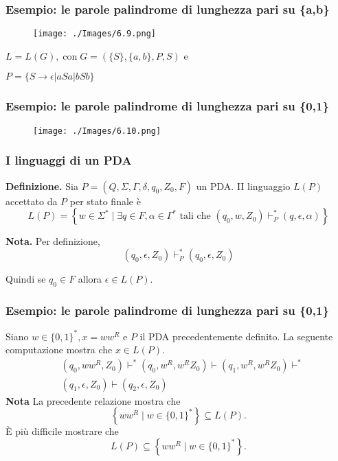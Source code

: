 \subsubsection{Esempio:
le parole palindrome di lunghezza pari su \{a,b\}}

\begin{figure}[hbpt!]
    \centering
    \texttt{[image: ./Images/6.9.png]}
\end{figure}
\FloatBarrier

$L=L(G), \operatorname{con} G=(\{S\},\{a, b\}, P, S)$ e

$P=\{S \rightarrow \epsilon|a S a| b S b\}$

\subsubsection{Esempio:
le parole palindrome di lunghezza pari su \{0,1\}}

\begin{figure}[hbpt!]
    \centering
    \texttt{[image: ./Images/6.10.png]}
\end{figure}
\FloatBarrier

\subsubsection{I linguaggi di un PDA}

\textbf{Definizione.} Sia $P=\left(Q, \Sigma, \Gamma, \delta, q_{0}, Z_{0}, F\right)$ un PDA. II linguaggio $L(P)$ accettato da $P$ per stato finale è
$$
L(P)=\left\{w \in \Sigma^{*} \mid \exists q \in F, \alpha \in \Gamma^{*} \text { tali che }\left(q_{0}, w, Z_{0}\right) \vdash_{P}^{*}(q, \epsilon, \alpha)\right\}
$$

\textbf{Nota.} Per definizione,
$$
\left(q_{0}, \epsilon, Z_{0}\right) \vdash_{P}^{*}\left(q_{0}, \epsilon, Z_{0}\right)
$$

Quindi se $q_{0} \in F$ allora $\epsilon \in L(P)$.

\subsubsection{Esempio:
le parole palindrome di lunghezza pari su \{0,1\}}


Siano $w \in\{0,1\}^{*}, x=w w^{R}$ e $P$ il PDA precedentemente definito.
La seguente computazione mostra che $x \in L(P)$.
$$
\begin{aligned}
&\left(q_{0}, w w^{R}, Z_{0}\right) \vdash^{*}\left(q_{0}, w^{R}, w^{R} Z_{0}\right) \vdash\left(q_{1}, w^{R}, w^{R} Z_{0}\right) \vdash^{*} \\
&\left(q_{1}, \epsilon, Z_{0}\right) \vdash\left(q_{2}, \epsilon, Z_{0}\right)
\end{aligned}
$$
\textbf{Nota}    La precedente relazione mostra che
$$
\left\{w w^{R} \mid w \in\{0,1\}^{*}\right\} \subseteq L(P) .
$$
È più difficile mostrare che
$$
L(P) \subseteq\left\{w w^{R} \mid w \in\{0,1\}^{*}\right\} .
$$

